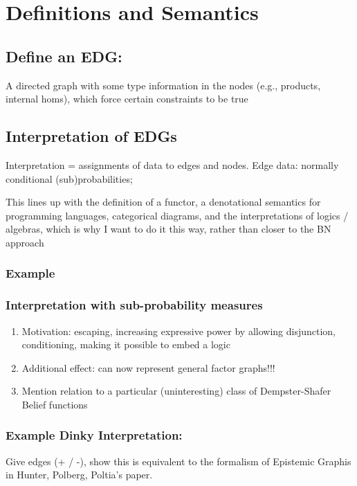 \documentclass[11pt]{article}
\begin{document}
\section{Definitions and Semantics}
\label{sec:orgfc52c0d}
\subsection{Define an EDG:}
\label{sec:org992e627}
A directed graph with some type information in the nodes (e.g., products, internal homs), which force certain constraints to be true

\subsection{Interpretation of EDGs}
\label{sec:org01d23c4}
Interpretation = assignments of data to edges and nodes. Edge data: normally conditional (sub)probabilities;  

This lines up with the definition of a functor, a denotational semantics for programming languages, categorical diagrams, and the interpretations of logics / algebras, which is why I want to do it this way, rather than closer to the BN approach
\subsubsection{Example}
\label{sec:org207475a}

\subsubsection{Interpretation with sub-probability measures}
\label{sec:orge06a106}
\begin{enumerate}
\item Motivation: escaping, increasing expressive power by allowing disjunction, conditioning, making it possible to embed a logic
\label{sec:orge411fd3}
\item Additional effect: can now represent general factor graphs!!!
\label{sec:org553d1c7}
\item Mention relation to a particular (uninteresting) class of Dempster-Shafer Belief functions
\label{sec:org186f14f}
\end{enumerate}


\subsubsection{Example Dinky Interpretation:}
\label{sec:orgbacbca4}
Give edges (+ / -), show this is equivalent to the formalism of Epistemic Graphis in Hunter, Polberg, Poltia's paper.
\end{document}
